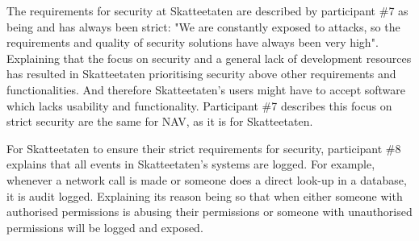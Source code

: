 
The requirements for security at Skatteetaten are described by participant \#7 as being and has always been strict: "We are constantly exposed to attacks, so the requirements and quality of security solutions have always been very high". Explaining that the focus on security and a general lack of development resources has resulted in Skatteetaten prioritising security above other requirements and functionalities. And therefore Skatteetaten's users might have to accept software which lacks usability and functionality. Participant \#7 describes this focus on strict security are the same for NAV, as it is for Skatteetaten.


For Skatteetaten to ensure their strict requirements for security, participant \#8 explains that all events in Skatteetaten's systems are logged. For example, whenever a network call is made or someone does a direct look-up in a database, it is audit logged. Explaining its reason being so that when either someone with authorised permissions is abusing their permissions or someone with unauthorised permissions will be logged and exposed.


